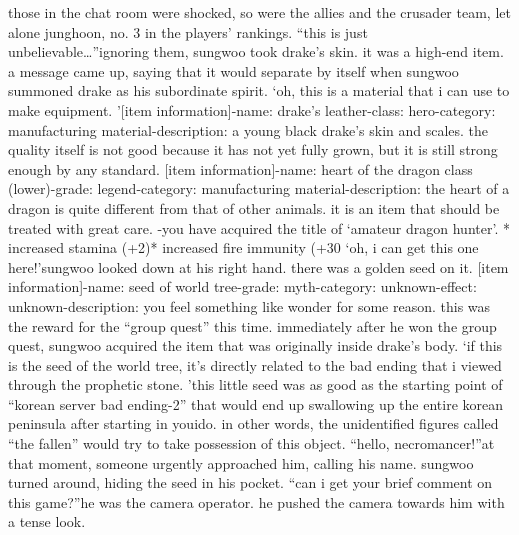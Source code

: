  those in the chat room were shocked, so were the allies and the crusader team, let alone junghoon, no.
3 in the players’ rankings.
“this is just unbelievable…”ignoring them, sungwoo took drake’s skin.
 it was a high-end item.
 a message came up, saying that it would separate by itself when sungwoo summoned drake as his subordinate spirit.
‘oh, this is a material that i can use to make equipment.
’[item information]-name: drake’s leather-class: hero-category: manufacturing material-description: a young black drake’s skin and scales.
 the quality itself is not good because it has not yet fully grown, but it is still strong enough by any standard.
[item information]-name: heart of the dragon class (lower)-grade: legend-category: manufacturing material-description: the heart of a dragon is quite different from that of other animals.
 it is an item that should be treated with great care.
-you have acquired the title of ‘amateur dragon hunter’.
* increased stamina (+2)* increased fire immunity (+30%
‘oh, i can get this one here!’sungwoo looked down at his right hand.
 there was a golden seed on it.
[item information]-name: seed of world tree-grade: myth-category: unknown-effect: unknown-description: you feel something like wonder for some reason.
this was the reward for the “group quest” this time.
 immediately after he won the group quest, sungwoo acquired the item that was originally inside drake’s body.
‘if this is the seed of the world tree, it’s directly related to the bad ending that i viewed through the prophetic stone.
’this little seed was as good as the starting point of “korean server bad ending-2” that would end up swallowing up the entire korean peninsula after starting in youido.
in other words, the unidentified figures called “the fallen” would try to take possession of this object.
“hello, necromancer!”at that moment, someone urgently approached him, calling his name.
 sungwoo turned around, hiding the seed in his pocket.
“can i get your brief comment on this game?”he was the camera operator.
 he pushed the camera towards him with a tense look.


